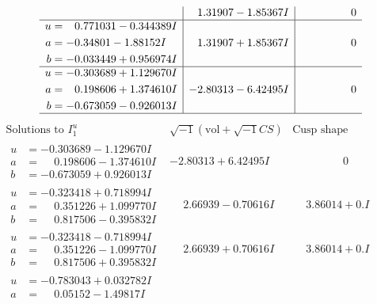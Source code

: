 \documentclass[1p]{elsarticle_modified}
\theoremstyle{definition}
\newcommand{\I}{\sqrt{-1}}
\begin{document}
$$\begin{array}{c|c|c}
 & \phantom{-}1.31907 - 1.85367 I & \phantom{-0.000000 } 0 \\ \hline\begin{aligned}
u &= \phantom{-}0.771031 - 0.344389 I \\
a &= -0.34801 - 1.88152 I \\
b &= -0.033449 + 0.956974 I\end{aligned}
 & \phantom{-}1.31907 + 1.85367 I & \phantom{-0.000000 } 0 \\ \hline\begin{aligned}
u &= -0.303689 + 1.129670 I \\
a &= \phantom{-}0.198606 + 1.374610 I \\
b &= -0.673059 - 0.926013 I\end{aligned}
 & -2.80313 - 6.42495 I & \phantom{-0.000000 } 0\\
 \hline 
 \end{array}$$\newpage$$\begin{array}{c|c|c}  
\text{Solutions to }I^u_{1}& \I (\text{vol} + \sqrt{-1}CS) & \text{Cusp shape}\\
 \hline 
\begin{aligned}
u &= -0.303689 - 1.129670 I \\
a &= \phantom{-}0.198606 - 1.374610 I \\
b &= -0.673059 + 0.926013 I\end{aligned}
 & -2.80313 + 6.42495 I & \phantom{-0.000000 } 0 \\ \hline\begin{aligned}
u &= -0.323418 + 0.718994 I \\
a &= \phantom{-}0.351226 + 1.099770 I \\
b &= \phantom{-}0.817506 - 0.395832 I\end{aligned}
 & \phantom{-}2.66939 - 0.70616 I & \phantom{-}3.86014 + 0. I\phantom{ +0.000000I} \\ \hline\begin{aligned}
u &= -0.323418 - 0.718994 I \\
a &= \phantom{-}0.351226 - 1.099770 I \\
b &= \phantom{-}0.817506 + 0.395832 I\end{aligned}
 & \phantom{-}2.66939 + 0.70616 I & \phantom{-}3.86014 + 0. I\phantom{ +0.000000I} \\ \hline\begin{aligned}
u &= -0.783043 + 0.032782 I \\
a &= \phantom{-}0.05152 - 1.49817 I \\

\end{aligned}
\end{array}$$
\end{document}
